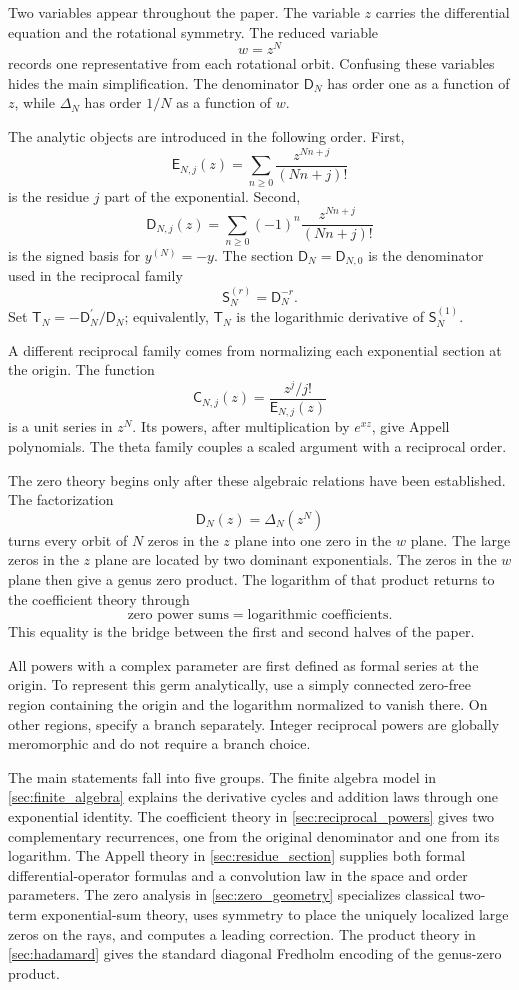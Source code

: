 \documentclass[11pt]{article}
\theoremstyle{definition}
\theoremstyle{remark}
\newcommand{\Dfun}{\mathsf D}
\newcommand{\Efun}{\mathsf E}
\newcommand{\Sfun}{\mathsf S}
\newcommand{\Tfun}{\mathsf T}
\newcommand{\Cfun}{\mathsf C}
\begin{document}
Two variables appear throughout the paper.  The variable $z$ carries the differential equation and the rotational symmetry.  The reduced variable
\[
w=z^N
\]
records one representative from each rotational orbit.  Confusing these variables hides the main simplification.  The denominator $\Dfun_N$ has order one as a function of $z$, while $\Delta_N$ has order $1/N$ as a function of $w$.

The analytic objects are introduced in the following order.  First,
\[
\Efun_{N,j}(z)
=
\sum_{n\geq0}\frac{z^{Nn+j}}{(Nn+j)!}
\]
is the residue $j$ part of the exponential.  Second,
\[
\Dfun_{N,j}(z)
=
\sum_{n\geq0}(-1)^n\frac{z^{Nn+j}}{(Nn+j)!}
\]
is the signed basis for $y^{(N)}=-y$.  The section $\Dfun_N=\Dfun_{N,0}$ is the denominator used in the reciprocal family
\[
\Sfun_N^{(r)}=\Dfun_N^{-r}.
\]
Set $\Tfun_N=-\Dfun_N^{\prime}/\Dfun_N$; equivalently, $\Tfun_N$ is the logarithmic derivative of $\Sfun_N^{(1)}$.

A different reciprocal family comes from normalizing each exponential section at the origin.  The function
\[
\Cfun_{N,j}(z)
=
\frac{z^j/j!}{\Efun_{N,j}(z)}
\]
is a unit series in $z^N$.  Its powers, after multiplication by $e^{xz}$, give Appell polynomials.  The theta family couples a scaled argument with a reciprocal order.

The zero theory begins only after these algebraic relations have been established.  The factorization
\[
\Dfun_N(z)=\Delta_N(z^N)
\]
turns every orbit of $N$ zeros in the $z$ plane into one zero in the $w$ plane.  The large zeros in the $z$ plane are located by two dominant exponentials.  The zeros in the $w$ plane then give a genus zero product.  The logarithm of that product returns to the coefficient theory through
\[
\text{zero power sums}
=
\text{logarithmic coefficients}.
\]
This equality is the bridge between the first and second halves of the paper.

All powers with a complex parameter are first defined as formal series at the origin.  To represent this germ analytically, use a simply connected zero-free region containing the origin and the logarithm normalized to vanish there.  On other regions, specify a branch separately.  Integer reciprocal powers are globally meromorphic and do not require a branch choice.

The main statements fall into five groups.  The finite algebra model in \cref{sec:finite_algebra} explains the derivative cycles and addition laws through one exponential identity.  The coefficient theory in \cref{sec:reciprocal_powers} gives two complementary recurrences, one from the original denominator and one from its logarithm.  The Appell theory in \cref{sec:residue_section} supplies both formal differential-operator formulas and a convolution law in the space and order parameters.  The zero analysis in \cref{sec:zero_geometry} specializes classical two-term exponential-sum theory, uses symmetry to place the uniquely localized large zeros on the rays, and computes a leading correction.  The product theory in \cref{sec:hadamard} gives the standard diagonal Fredholm encoding of the genus-zero product.
\end{document}
